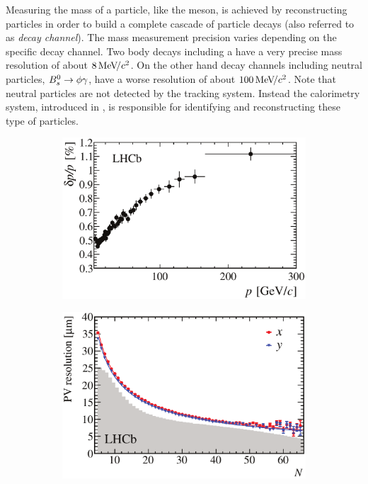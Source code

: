 Measuring the mass of a particle, like the \Bs meson, is achieved by reconstructing particles in order to build a
complete cascade of particle decays (also referred to as {\it decay channel}). The mass measurement precision varies depending
on the specific decay channel. Two body \B decays including a \jpsi have a very precise mass resolution of about
$8 {\mathrm{\,Me\kern -0.1em V\!/}c^2}$. On the other hand decay channels including neutral particles, \ie $B^0_s\rightarrow\phi\gamma$, have a worse
resolution of about $100 {\mathrm{\,Me\kern -0.1em V\!/}c^2}$. Note that neutral particles are not detected by the tracking system.
Instead the calorimetry system, introduced in , is responsible for identifying and
reconstructing these type of particles.

\begin{figure}[t]
  \centering
  \begin{subfigure}{0.5\textwidth}
    \raggedright
    \includegraphics[width=\textwidth]{Figures/Chapter2/dppVsp-crop-cmyk}
    \caption{}
    \label{det_deltappvp}
  \end{subfigure}%
  \hfill%
  \begin{subfigure}{0.5\textwidth}
    \raggedleft
    \includegraphics[width=\textwidth]{Figures/Chapter2/DataResXY_1PV_2012-crop-cmyk.pdf}

\end{subfigure}
\end{figure}
